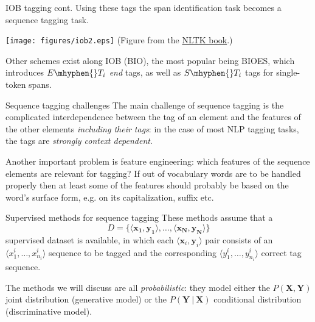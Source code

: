 \documentclass[style=upen, size=14pt]{powerdot}
\newcommand{\gold}{\color{arany}}
\theoremstyle{definition}
\begin{document}
 \begin{slide}[toc=]{IOB tagging cont.}
   Using these tags the span identification task becomes a sequence tagging
   task.
   
   \begin{center}
     \texttt{[image: figures/iob2.eps]}
     \footnotesize(Figure from the \href{http://www.nltk.org/book/ch07.html}{NLTK book}.)
    \end{center}
    
    Other schemes exist along IOB (BIO), the most popular being BIOES, which
    introduces $E\mhyphen{}T_i$ \emph{end} tags, as well as $S\mhyphen{}T_i$
    tags for single-token spans.
  \end{slide}

  \begin{slide}[toc=Challenges]{Sequence tagging challenges}
    The main challenge of sequence tagging is the complicated interdependence
    between the tag of an element and the features of the other elements
    \emph{including their tags}: in the case of most NLP tagging tasks, the
    tags are \emph{\gold strongly context dependent}.\bigskip

    Another important problem is feature engineering: which features of the
    sequence elements are relevant for tagging? If out of vocabulary words are
    to be handled properly then at least some of the features should probably be
    based on the word's surface form, e.g. on its capitalization, suffix etc.    
  \end{slide}
  
  \begin{slide}[toc=Supervised methods]{Supervised methods for sequence tagging}
    These methods assume that a
    $$D=\{\langle \mathbf{x_1},\mathbf{y_1} \rangle,\dots, \langle \mathbf{x_N},\mathbf{y_N} \rangle\}$$
    supervised dataset is available, in which each
    $\langle \mathbf{x}_i, \mathbf{y}_i \rangle$ pair consists of an
    $\langle x_1^i,\dots,x_{n_i}^i\rangle$ sequence to be tagged and the
    corresponding $\langle y_1^i,\dots,y_{n_i}^i\rangle$ correct tag sequence.\bigskip

    The methods we will discuss are all \emph{probabilistic}: they model either
    the $ P(\mathbf{X}, \mathbf{Y}) $ joint distribution (generative model) or
    the $ P(\mathbf{Y}~|~\mathbf{X}) $ conditional distribution (discriminative
    model).
  \end{slide}
\end{document}
